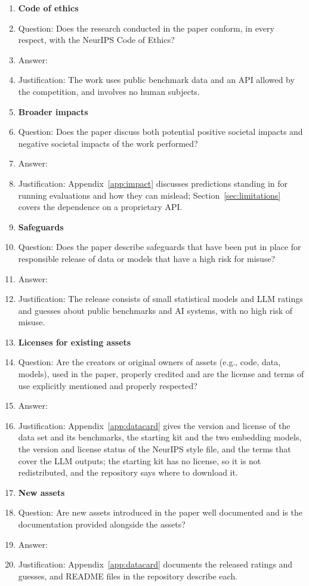 \begin{enumerate}
\item {\bf Code of ethics}
  \item[] Question: Does the research conducted in the paper conform, in every respect, with the NeurIPS Code of Ethics?
  \item[] Answer: \answerYes{}
  \item[] Justification: The work uses public benchmark data and an API allowed by the competition, and involves no human subjects.

\item {\bf Broader impacts}
  \item[] Question: Does the paper discuss both potential positive societal impacts and negative societal impacts of the work performed?
  \item[] Answer: \answerYes{}
  \item[] Justification: Appendix~\ref{app:impact} discusses predictions standing in for running evaluations and how they can mislead; Section~\ref{sec:limitations} covers the dependence on a proprietary API.

\item {\bf Safeguards}
  \item[] Question: Does the paper describe safeguards that have been put in place for responsible release of data or models that have a high risk for misuse?
  \item[] Answer: \answerNA{}
  \item[] Justification: The release consists of small statistical models and LLM ratings and guesses about public benchmarks and AI systems, with no high risk of misuse.

\item {\bf Licenses for existing assets}
  \item[] Question: Are the creators or original owners of assets (e.g., code, data, models), used in the paper, properly credited and are the license and terms of use explicitly mentioned and properly respected?
  \item[] Answer: \answerYes{}
  \item[] Justification: Appendix~\ref{app:datacard} gives the version and license of the data set and its benchmarks, the starting kit and the two embedding models, the version and license status of the NeurIPS style file, and the terms that cover the LLM outputs; the starting kit has no license, so it is not redistributed, and the repository says where to download it.

\item {\bf New assets}
  \item[] Question: Are new assets introduced in the paper well documented and is the documentation provided alongside the assets?
  \item[] Answer: \answerYes{}
  \item[] Justification: Appendix~\ref{app:datacard} documents the released ratings and guesses, and README files in the repository describe each.


\end{enumerate}
